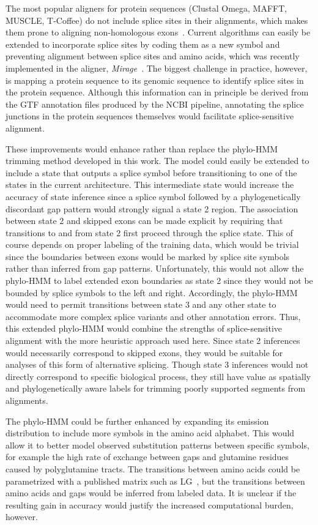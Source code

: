 \documentclass[10pt,letterpaper]{article}
\begin{document}
The most popular aligners for protein sequences (Clustal Omega, MAFFT, MUSCLE, T-Coffee) do not include splice sites in their alignments, which makes them prone to aligning non-homologous exons~\cite{Sievers2017, Katoh2013, Edgar2004, Notredame2000}. Current algorithms can easily be extended to incorporate splice sites by coding them as a new symbol and preventing alignment between splice sites and amino acids, which was recently implemented in the aligner, \textit{Mirage}~\cite{Nord2018}. The biggest challenge in practice, however, is mapping a protein sequence to its genomic sequence to identify splice sites in the protein sequence. Although this information can in principle be derived from the GTF annotation files produced by the NCBI pipeline, annotating the splice junctions in the protein sequences themselves would facilitate splice-sensitive alignment.

These improvements would enhance rather than replace the phylo-HMM trimming method developed in this work. The model could easily be extended to include a state that outputs a splice symbol before transitioning to one of the states in the current architecture. This intermediate state would increase the accuracy of state inference since a splice symbol followed by a phylogenetically discordant gap pattern would strongly signal a state 2 region. The association between state 2 and skipped exons can be made explicit by requiring that transitions to and from state 2 first proceed through the splice state. This of course depends on proper labeling of the training data, which would be trivial since the boundaries between exons would be marked by splice site symbols rather than inferred from gap patterns. Unfortunately, this would not allow the phylo-HMM to label extended exon boundaries as state 2 since they would not be bounded by splice symbols to the left and right. Accordingly, the phylo-HMM would need to permit transitions between state 3 and any other state to accommodate more complex splice variants and other annotation errors. Thus, this extended phylo-HMM would combine the strengths of splice-sensitive alignment with the more heuristic approach used here. Since state 2 inferences would necessarily correspond to skipped exons, they would be suitable for analyses of this form of alternative splicing. Though state 3 inferences would not directly correspond to specific biological process, they still have value as spatially and phylogenetically aware labels for trimming poorly supported segments from alignments.

The phylo-HMM could be further enhanced by expanding its emission distribution to include more symbols in the amino acid alphabet. This would allow it to better model observed substitution patterns between specific symbols, for example the high rate of exchange between gaps and glutamine residues caused by polyglutamine tracts. The transitions between amino acids could be parametrized with a published matrix such as LG~\cite{Le2008}, but the transitions between amino acids and gaps would be inferred from labeled data. It is unclear if the resulting gain in accuracy would justify the increased computational burden, however.
\end{document}
